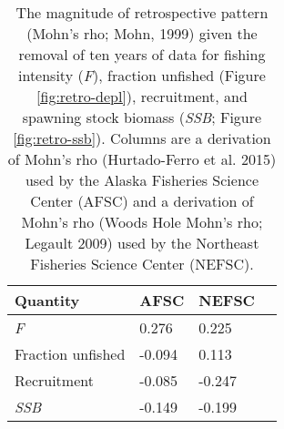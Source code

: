 
\begin{longtable}[t]{llll}
\caption{\label{tab:RetroMohnsrho}The magnitude of retrospective pattern (Mohn's rho; Mohn, 1999) given the removal of ten years of data for fishing intensity (\emph{F}), fraction unfished (Figure \ref{fig:retro-depl}),  recruitment, and spawning stock biomass (\emph{SSB}; Figure \ref{fig:retro-ssb}). Columns are a derivation of Mohn's rho (Hurtado-Ferro et al. 2015) used by the Alaska Fisheries Science Center (AFSC) and a derivation of Mohn's rho (Woods Hole Mohn's rho; Legault 2009) used by the Northeast Fisheries Science Center (NEFSC).}\\
\toprule
Quantity & AFSC & NEFSC\\
\midrule
\emph{F} & 0.276 & 0.225\\
Fraction unfished & -0.094 & 0.113\\
Recruitment & -0.085 & -0.247\\
\emph{SSB} & -0.149 & -0.199\\
\bottomrule
\end{longtable}

